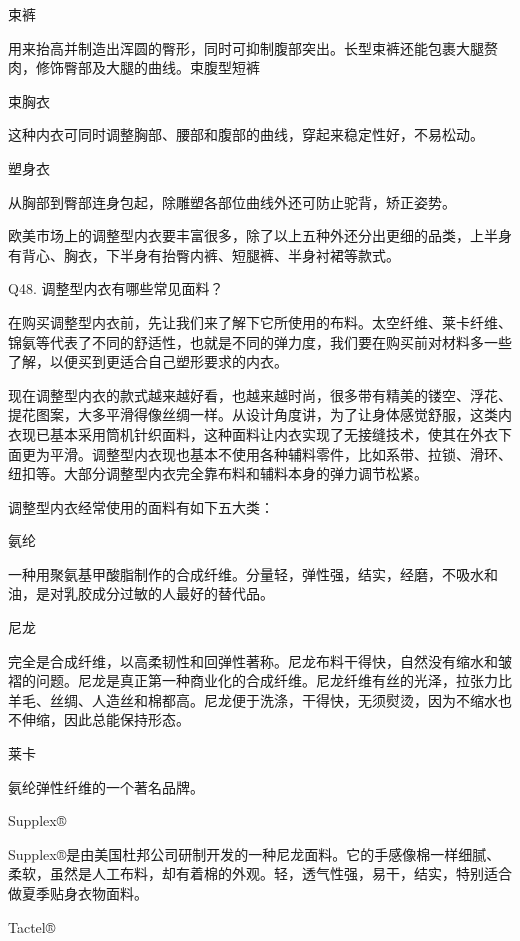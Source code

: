 \documentclass[12pt,UTF8]{ctexbook}
\begin{document}
束裤

用来抬高并制造出浑圆的臀形，同时可抑制腹部突出。长型束裤还能包裹大腿赘肉，修饰臀部及大腿的曲线。束腹型短裤





束胸衣

这种内衣可同时调整胸部、腰部和腹部的曲线，穿起来稳定性好，不易松动。



塑身衣

从胸部到臀部连身包起，除雕塑各部位曲线外还可防止驼背，矫正姿势。



欧美市场上的调整型内衣要丰富很多，除了以上五种外还分出更细的品类，上半身有背心、胸衣，下半身有抬臀内裤、短腿裤、半身衬裙等款式。





Q48. 调整型内衣有哪些常见面料？


在购买调整型内衣前，先让我们来了解下它所使用的布料。太空纤维、莱卡纤维、锦氨等代表了不同的舒适性，也就是不同的弹力度，我们要在购买前对材料多一些了解，以便买到更适合自己塑形要求的内衣。

现在调整型内衣的款式越来越好看，也越来越时尚，很多带有精美的镂空、浮花、提花图案，大多平滑得像丝绸一样。从设计角度讲，为了让身体感觉舒服，这类内衣现已基本采用筒机针织面料，这种面料让内衣实现了无接缝技术，使其在外衣下面更为平滑。调整型内衣现也基本不使用各种辅料零件，比如系带、拉锁、滑环、纽扣等。大部分调整型内衣完全靠布料和辅料本身的弹力调节松紧。


调整型内衣经常使用的面料有如下五大类：

氨纶

一种用聚氨基甲酸脂制作的合成纤维。分量轻，弹性强，结实，经磨，不吸水和油，是对乳胶成分过敏的人最好的替代品。

尼龙

完全是合成纤维，以高柔韧性和回弹性著称。尼龙布料干得快，自然没有缩水和皱褶的问题。尼龙是真正第一种商业化的合成纤维。尼龙纤维有丝的光泽，拉张力比羊毛、丝绸、人造丝和棉都高。尼龙便于洗涤，干得快，无须熨烫，因为不缩水也不伸缩，因此总能保持形态。

莱卡

氨纶弹性纤维的一个著名品牌。

Supplex®

Supplex®是由美国杜邦公司研制开发的一种尼龙面料。它的手感像棉一样细腻、柔软，虽然是人工布料，却有着棉的外观。轻，透气性强，易干，结实，特别适合做夏季贴身衣物面料。

Tactel®
\end{document}
